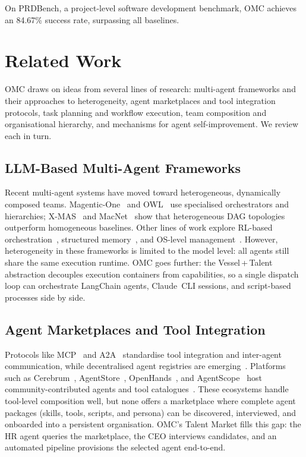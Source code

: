 \documentclass[11pt,a4paper]{article}
\begin{document}
On PRDBench, a project-level software development benchmark, OMC achieves an 84.67\% success rate, surpassing all baselines.

\section{Related Work}
\label{sec:related}

OMC draws on ideas from several lines of research: multi-agent frameworks and their approaches to heterogeneity, agent marketplaces and tool integration protocols, task planning and workflow execution, team composition and organisational hierarchy, and mechanisms for agent self-improvement.  We review each in turn.

\subsection{LLM-Based Multi-Agent Frameworks}
\label{sec:rw-mas}

Recent multi-agent systems have moved toward heterogeneous, dynamically composed teams. Magentic-One~\cite{fourney2024magenticone} and OWL~\cite{hu2025owl} use specialised orchestrators and hierarchies; X-MAS~\cite{ye2025xmas} and MacNet~\cite{qian2025macnet} show that heterogeneous DAG topologies outperform homogeneous baselines. Other lines of work explore RL-based orchestration~\cite{dang2025evolving}, structured memory~\cite{yuen2025intrinsic}, and OS-level management~\cite{agentforge2025, wang2025openhands, mei2025aios}. However, heterogeneity in these frameworks is limited to the model level: all agents still share the same execution runtime. OMC goes further: the Vessel\,+\,Talent abstraction decouples execution containers from capabilities, so a single dispatch loop can orchestrate LangChain agents, Claude~CLI sessions, and script-based processes side by side.


\subsection{Agent Marketplaces and Tool Integration}
\label{sec:rw-ecosystem}

Protocols like MCP~\cite{hou2025mcp} and A2A~\cite{google2025a2a} standardise tool integration and inter-agent communication, while decentralised agent registries are emerging~\cite{singh2025registry, ehtesham2025interop}. Platforms such as Cerebrum~\cite{rama2025cerebrum, mei2025aios}, AgentStore~\cite{jia2025agentstore}, OpenHands~\cite{wang2025openhands}, and AgentScope~\cite{gao2025agentscope} host community-contributed agents and tool catalogues~\cite{yang2025sweagent, mcpzoo2025}. These ecosystems handle tool-level composition well, but none offers a marketplace where complete agent packages (skills, tools, scripts, and persona) can be discovered, interviewed, and onboarded into a persistent organisation. OMC's Talent Market fills this gap: the HR agent queries the marketplace, the CEO interviews candidates, and an automated pipeline provisions the selected agent end-to-end.
\end{document}
